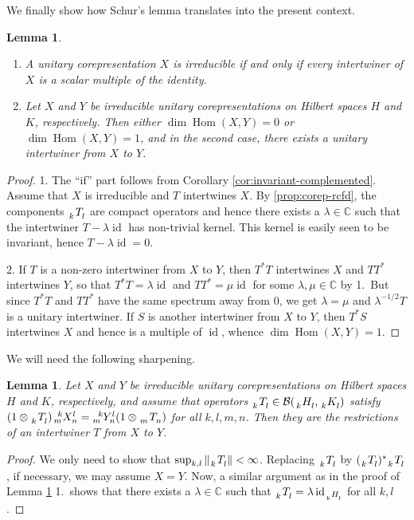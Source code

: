 \documentclass[11pt]{article}
\DeclareMathOperator{\Hom}{Hom}
\DeclareMathOperator{\id}{id}
\newcommand{\C}{\mathbb{C}}
\newcommand{\Gr}[5]{\,\tensor*[^{#2}_{#4}]{#1}{^{#3}_{#5}}}%
\newcommand{\Grd}[3]{\Gr{#1}{}{}{#2}{#3}}
\newtheorem{Lem}[Theorem]{Lemma}
\theoremstyle{definition}
\numberwithin{equation}{section}
\begin{document}
We finally show how  Schur's lemma translates into the present context. %
\begin{Lem} \label{lem:schur}
  \begin{enumerate}
  \item   A unitary corepresentation $X$ is irreducible if and only if every
  intertwiner of $X$ is a scalar multiple of the identity.
\item Let $X$ and $Y$ be irreducible unitary corepresentations on Hilbert spaces $H$ and $K$,
  respectively.  Then either $\dim \Hom(X,Y) = 0$ or $\dim\Hom(X,Y)=1$, and in the second case,
  there exists a unitary intertwiner from $X$ to $Y$.
  \end{enumerate}
\end{Lem}
\begin{proof}%
  1. The ``if'' part follows from Corollary \ref{cor:invariant-complemented}.  Assume that $X$ is
  irreducible and $T$ intertwines $X$. By \ref{prop:corep-rcfd}, the components $\Grd{T}{k}{l}$ are
  compact operators and hence there exists a $\lambda\in \C$ such that the intertwiner $T-\lambda
  \id$ has non-trivial kernel. This kernel is easily seen to be invariant, hence $T-\lambda \id =
  0$.

  2. If $T$ is a non-zero intertwiner from $X$ to $Y$, then $T^{*}T$ intertwines $X$ and $TT^{*}$
  intertwines $Y$, so that $T^{*}T=\lambda \id$ and $TT^{*}=\mu\id$ for some $\lambda,\mu\in\C$ by
  1.\ But since $T^{*}T$ and $TT^{*}$ have the same spectrum away from $0$, we get $\lambda=\mu$ and
  $\lambda^{-1/2}T$ is a unitary intertwiner. If $S$ is another intertwiner from $X$ to $Y$, then $T^{*}S$
  intertwines $X$ and hence is a multiple of $\id$, whence $\dim\Hom(X,Y)=1$.
\end{proof}
We will need the following sharpening. %
\begin{Lem} \label{lem:schur-algebraic}
  Let $X$ and $Y$ be irreducible unitary corepresentations on Hilbert spaces $H$ and $K$,
  respectively, and assume that operators $ \Grd{T}{k}{l} \in
  \mathcal{B}(\Grd{H}{k}{l},\Grd{K}{k}{l}) $ satisfy $(1 \otimes \Grd{T}{k}{l})\Gr{X}{k}{l}{m}{n} =
  \Gr{Y}{k}{l}{m}{n}(1\otimes \Grd{T}{m}{n})$ for all $k,l,m,n$. Then they are the restrictions of
  an intertwiner $T$ from $X$ to $Y$. 
\end{Lem}
\begin{proof}
  We only need to show that $\sup_{k,l} \|\Grd{T}{k}{l}\|<\infty$. Replacing $\Grd{T}{k}{l}$ by
  $(\Grd{T}{k}{l})^{*}\Grd{T}{k}{l}$, if necessary, we may assume $X=Y$. Now, a similar argument as
  in the proof of Lemma \ref{lem:schur} 1.\ shows that there exists a $\lambda\in \C$ such that
  $\Grd{T}{k}{l}=\lambda \id_{\Grd{H}{k}{l}}$ for all $k,l$.  
\end{proof}
\end{document}
